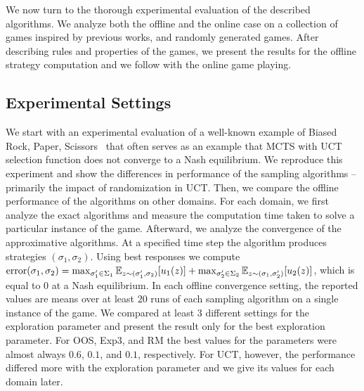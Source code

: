 
We now turn to the thorough experimental evaluation of the described algorithms.
We analyze both the offline and the online case on a collection of games inspired by previous works, and randomly generated games.
After describing rules and properties of the games, we present the results for the offline strategy computation and we follow with the online game playing.

\subsection{Experimental Settings}

We start with an experimental evaluation of a well-known example of Biased Rock, Paper, Scissors~\cite{Shafiei09} that often serves
as an example that MCTS with UCT selection function does not converge to a Nash equilibrium.
We reproduce this experiment and show the differences in performance of the sampling algorithms -- primarily the impact of randomization in UCT.
Then, we compare the offline performance of the algorithms on other domains.
For each domain, we first analyze the exact algorithms and measure the computation time taken to solve a particular instance of the game.
Afterward, we analyze the convergence of the approximative algorithms.
At a specified time step the algorithm produces strategies $(\sigma_1,\sigma_2)$. Using best responses we compute
$\textrm{error}(\sigma_1,\sigma_2) = \max_{\sigma_1' \in \Sigma_1} \mathbb{E}_{z \sim (\sigma_1',\sigma_2)}[u_1(z)]
                                   + \max_{\sigma_2' \in \Sigma_2} \mathbb{E}_{z \sim (\sigma_1,\sigma_2')}[u_2(z)]$,
which is equal to $0$ at a Nash equilibrium.
In each offline convergence setting, the reported values are means over at least $20$ runs of each sampling algorithm on a single instance of the game.
We compared at least $3$ different settings for the exploration parameter and present the result only for the best exploration parameter.
For OOS, Exp3, and RM the best values for the parameters were almost always $0.6$, $0.1$, and $0.1$, respectively.
For UCT, however, the performance differed more with the exploration parameter and we give its values for each domain later.

